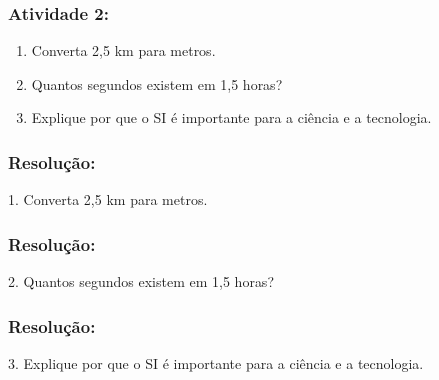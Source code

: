 \documentclass[12pt]{beamer}
\begin{document}
\begin{frame}
    \frametitle{Atividade 2:}
    \begin{enumerate}
        \item Converta 2,5 km para metros.
        \item Quantos segundos existem em 1,5 horas?
        \item Explique por que o SI é importante para a ciência e a tecnologia.
    \end{enumerate}

\end{frame}

\begin{frame}
    \frametitle{Resolução:}
        1. Converta 2,5 km para metros.
        \vspace{6cm}
    
\end{frame}

\begin{frame}
    \frametitle{Resolução:}
        2. Quantos segundos existem em 1,5 horas?
        \vspace{6cm}
    
\end{frame}

\begin{frame}
    \frametitle{Resolução:}
        3. Explique por que o SI é importante para a ciência e a tecnologia.
        \vspace{6cm}
    
\end{frame}
\end{document}
